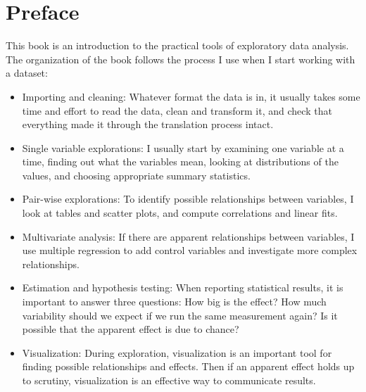 \documentclass[12pt]{book}
\begin{document}
\fi

\chapter{Preface}
\label{preface}

This book is an
introduction to the practical tools of exploratory data analysis.
The organization of the book follows the process I use
when I start working with a dataset:

\begin{itemize}

\item Importing and cleaning: Whatever format the data is in, it
  usually takes some time and effort to read the data, clean and
  transform it, and check that everything made it through the
  translation process intact.

\item Single variable explorations: I usually start by examining one
  variable at a time, finding out what the variables mean, looking
  at distributions of the values, and choosing appropriate
  summary statistics.

\item Pair-wise explorations: To identify possible relationships
  between variables, I look at tables and scatter plots, and compute
  correlations and linear fits.

\item Multivariate analysis: If there are apparent relationships
  between variables, I use multiple regression to add control variables
  and investigate more complex relationships.

\item Estimation and hypothesis testing: When reporting statistical
  results, it is important to answer three questions: How big is
  the effect?  How much variability should we expect if we run the same
  measurement again?  Is it possible that the apparent effect is
  due to chance?

\item Visualization: During exploration, visualization is an important 
  tool for finding possible relationships and effects.  Then if an
  apparent effect holds up to scrutiny, visualization is an effective
  way to communicate results.

\end{itemize}
\end{document}
